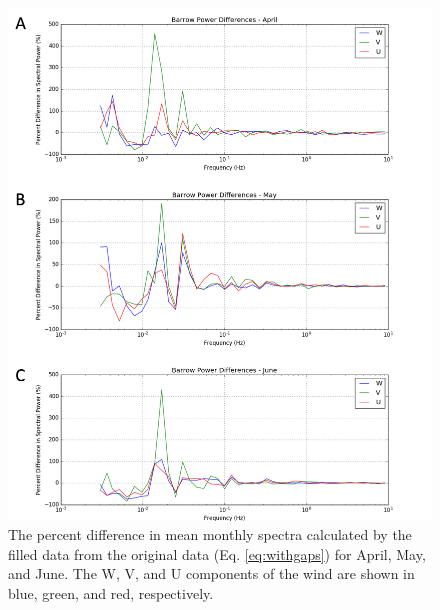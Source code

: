   \begin{figure}[h]
    \centering
    \includegraphics[width=1\linewidth]{figures/appendixb/barrow_power_april.png}
    \caption[Barrow, Alaska power spectra]{The percent difference in mean monthly spectra calculated by the filled data from the original data (Eq. \ref{eq:withgaps}) for April, May, and June. The W, V, and U components of the wind are shown in blue, green, and red, respectively.}
    \label{fig:barrow_diff}
\end{figure}


